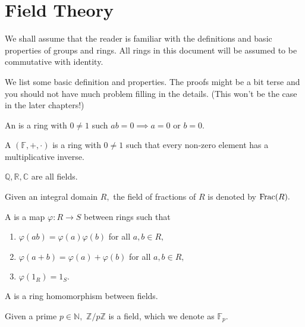 \section{Field Theory}

We shall assume that the reader is familiar with the definitions and basic properties of groups and rings. All rings in this document will be assumed to be commutative with identity. 

We list some basic definition and properties. The proofs might be a bit terse and you should not have much problem filling in the details. (This won't be the case in the later chapters!)

\begin{defn}%
    An  is a ring with $0 \neq 1$ such $ab = 0 \implies a = 0$ or $b = 0.$
\end{defn}

\begin{defn}%
    A  $(\mathbb{F}, +, \cdot)$ is a ring with $0 \neq 1$ such that every non-zero element has a multiplicative inverse.
\end{defn}

\begin{ex}
    $\mathbb{Q}, \mathbb{R}, \mathbb{C}$ are all fields.
\end{ex}

\begin{defn}%
    Given an integral domain $R,$ the field of fractions of $R$ is denoted by $\operatorname{Frac}(R).$
\end{defn}

\begin{defn}%
    A  is a map $\varphi : R \to S$ between rings such that
    \begin{enumerate}
        \item $\varphi(ab) = \varphi(a)\varphi(b)$ for all $a, b \in R,$
        \item $\varphi(a + b) = \varphi(a) + \varphi(b)$ for all $a, b \in R,$
        \item $\varphi(1_R) = 1_S.$
    \end{enumerate}
    A  is a ring homomorphism between fields.
\end{defn}

\begin{defn}%
    Given a prime $p \in \mathbb{N},$ $\mathbb{Z}/p\mathbb{Z}$ is a field, which we denote as $\mathbb{F}_p.$
\end{defn}

